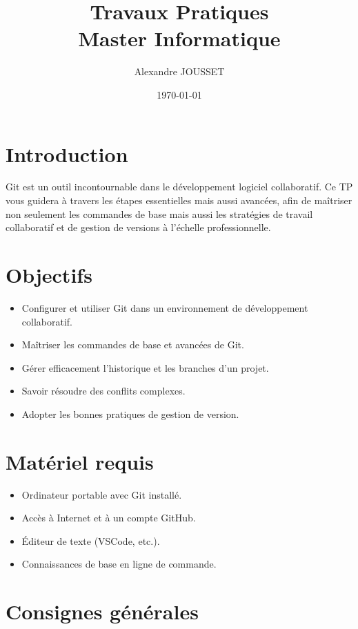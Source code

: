 \documentclass[a4paper,12pt]{article}
\title{Travaux Pratiques \\ Master Informatique}
\author{Alexandre JOUSSET}
\date{\today}
\begin{document}
\maketitle

\section*{Introduction}

Git est un outil incontournable dans le développement logiciel collaboratif.  
Ce TP vous guidera à travers les étapes essentielles mais aussi avancées, afin de maîtriser non seulement les commandes de base mais aussi les stratégies de travail collaboratif et de gestion de versions à l'échelle professionnelle.

\section*{Objectifs}

\begin{itemize}
    \item Configurer et utiliser Git dans un environnement de développement collaboratif.
    \item Maîtriser les commandes de base et avancées de Git.
    \item Gérer efficacement l’historique et les branches d’un projet.
    \item Savoir résoudre des conflits complexes.
    \item Adopter les bonnes pratiques de gestion de version.
\end{itemize}

\section*{Matériel requis}

\begin{itemize} 
    \item Ordinateur portable avec Git installé.
    \item Accès à Internet et à un compte GitHub.
    \item Éditeur de texte (VSCode, etc.).
    \item Connaissances de base en ligne de commande.
\end{itemize}

\section*{Consignes générales}
\end{document}
